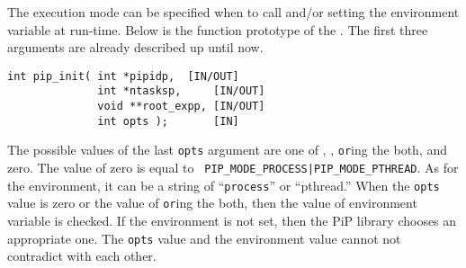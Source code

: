 The execution mode can be specified when to call 
and/or setting the  environment variable at
run-time. Below is the function prototype of the
. The first three arguments are already described
up until now.

\begin{lstlisting}[frame=tRBl]
int pip_init( int *pipidp,	[IN/OUT]
              int *ntasksp,     [IN/OUT]
              void **root_expp, [IN/OUT]
              int opts );       [IN]
\end{lstlisting}

The possible values of the last {\tt opts} argument are one of 
, , {\tt or}ing
the both, and zero. The value of zero is equal to {\tt
  PIP_MODE_PROCESS|PIP_MODE_PTHREAD}. As for the 
environment, it can be a string of ``{\tt process}'' or
``pthread.''
When the {\tt opts} value is zero or the value of {\tt or}ing the
both, then the value of  environment variable is
checked. If the environment is not set, then the PiP library chooses
an appropriate one. The {\tt opts} value and the environment value
cannot not contradict with each other.

